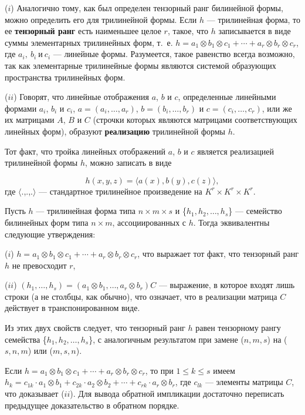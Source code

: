 \documentclass{mai_book}
\begin{document}
  \begin{determ}
($i$) Аналогично тому, как был определен тензорный ранг билинейной формы, можно определить его для трилинейной формы. Если $h$ --- трилинейная форма, то ее \textbf{тензорный ранг} есть наименьшее целое $r$, такое, что $h$ записывается в виде суммы элементарных трилинейных форм, т.~е. $h = a_1 \otimes b_1 \otimes c_1 + \cdots + a_r \otimes b_r \otimes c_r$, где $a_i,\ b_i\ и\ c_i$ --- линейные формы. Разумеется, такое равенство всегда возможно, так как элементарные трилинейные формы являются системой образующих  пространства трилинейных форм.\par
    ($ii$) Говорят, что линейные отображения $a$, $b$ и $c$, определенные линейными формами $a_i$, $b_i$ и $c_i$, $a = (a_i,\dots,a_r)$, $b = (b_i,\dots,b_r)$ и $c= (c_i,\dots,c_r)$, или же их матрицами $A$, $B$ и $C$ (строчки которых являются матрицами соответствующих линейных форм), образуют \textbf{реализацию} трилинейной формы $h$.\par
Тот факт, что тройка линейных отображений $a$, $b$ и $c$ является реализацией трилинейной формы $h$, можно записать в виде\par
  $$h(x,y,z)= \langle a(x), b(y), c(z) \rangle ,$$ где $\langle$.,.,.$\rangle$ --- стандартное трилинейное произведение на $K^r \times K^r \times K^r$.
  \end{determ}
  \begin{predl}
Пусть $h$ --- трилинейная форма типа $n \times m \times s$ и \{$h_1,h_2,\dots,h_s$\} --- семейство билинейных форм типа $n \times m$, ассоциированных с $h$. Тогда эквивалентны следующие утверждения:\par
($i$) $h = a_1 \otimes b_1 \otimes c_1 + \cdots + a_r \otimes b_r \otimes c_r$, что выражает тот факт, что тензорный ранг $h$ не превосходит $r$,\par 
($ii$) $(h_1,\dots,h_s) = (a_1 \otimes b_1,\dots,a_r \otimes b_r)C$ --- выражение, в которое входят лишь строки (а не столбцы, как обычно), что означает, что в реализации матрица $C$ действует в транспонированном виде.\par 
Из этих двух свойств следует, что тензорный ранг $h$ равен тензорному рангу семейства \{$h_1,h_2,\dots,h_s$\}, с аналогичным результатом при замене ($n, m, s$) на ($s, n, m$) или ($m, s, n$).
\end{predl}
\begin{myproof}
  Если $h = a_1 \otimes b_1 \otimes c_1 + \cdots + a_r \otimes b_r \otimes c_r$, то при $1 \leqslant k \leqslant s$ имеем $h_k = c_{1k} \cdot a_1 \otimes b_1 + c_{2k} \cdot a_2 \otimes b_2 + \cdots + c_{rk} \cdot a_r \otimes b_r$, где $c_{lk}$ --- элементы матрицы $C$, что доказывает ($ii$). Для вывода обратной импликации достаточно переписать предыдущее доказательство в обратном порядке.
  \end{myproof}
\end{document}
